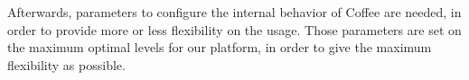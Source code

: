 Afterwards, parameters to configure the internal behavior of Coffee are needed, in order to provide more or less flexibility on the usage.
Those parameters are set on the maximum optimal levels for our platform, in order to give the maximum flexibility as possible.







